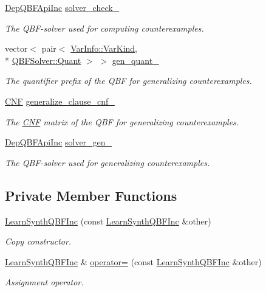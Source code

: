 \begin{DoxyCompactItemize}
\hyperlink{classDepQBFApiInc}{Dep\-Q\-B\-F\-Api\-Inc} \hyperlink{classLearnSynthQBFInc_aff50a974e8faf0e9e9d7431b46e0d8c5}{solver\-\_\-check\-\_\-}
\begin{DoxyCompactList}\small\item\em The Q\-B\-F-\/solver used for computing counterexamples. \end{DoxyCompactList}\item 
vector$<$ pair$<$ \hyperlink{classVarInfo_a64d1da76cf84fe674e5fef9764ef11cf}{Var\-Info\-::\-Var\-Kind}, \\*
\hyperlink{classQBFSolver_ac091e263cb55286cc07b2451bcf4d3c7}{Q\-B\-F\-Solver\-::\-Quant} $>$ $>$ \hyperlink{classLearnSynthQBFInc_af42c16902cfccdf51d1c1bc112be0ee4}{gen\-\_\-quant\-\_\-}
\begin{DoxyCompactList}\small\item\em The quantifier prefix of the Q\-B\-F for generalizing counterexamples. \end{DoxyCompactList}\item 
\hyperlink{classCNF}{C\-N\-F} \hyperlink{classLearnSynthQBFInc_ad3d20b7d5e6b561c7cf46324962247ba}{generalize\-\_\-clause\-\_\-cnf\-\_\-}
\begin{DoxyCompactList}\small\item\em The \hyperlink{classCNF}{C\-N\-F} matrix of the Q\-B\-F for generalizing counterexamples. \end{DoxyCompactList}\item 
\hyperlink{classDepQBFApiInc}{Dep\-Q\-B\-F\-Api\-Inc} \hyperlink{classLearnSynthQBFInc_a8cb5e0c1c5516ac1d65537c64794ec0a}{solver\-\_\-gen\-\_\-}
\begin{DoxyCompactList}\small\item\em The Q\-B\-F-\/solver used for generalizing counterexamples. \end{DoxyCompactList}\end{DoxyCompactItemize}
\subsection*{Private Member Functions}
\begin{DoxyCompactItemize}
\item 
\hyperlink{classLearnSynthQBFInc_adbb7481fd8c287942417c9ae75b06e8b}{Learn\-Synth\-Q\-B\-F\-Inc} (const \hyperlink{classLearnSynthQBFInc}{Learn\-Synth\-Q\-B\-F\-Inc} \&other)
\begin{DoxyCompactList}\small\item\em Copy constructor. \end{DoxyCompactList}\item 
\hyperlink{classLearnSynthQBFInc}{Learn\-Synth\-Q\-B\-F\-Inc} \& \hyperlink{classLearnSynthQBFInc_a09bc59c4c8a80e064fe4535314ee2acb}{operator=} (const \hyperlink{classLearnSynthQBFInc}{Learn\-Synth\-Q\-B\-F\-Inc} \&other)
\begin{DoxyCompactList}\small\item\em Assignment operator. \end{DoxyCompactList}\end{DoxyCompactItemize}


